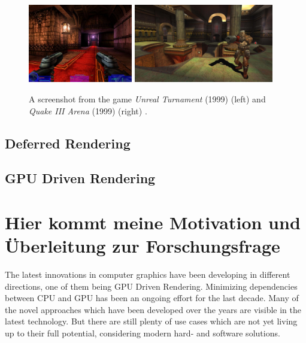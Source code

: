 \begin{figure}[h]
    \centering
    \includegraphics[width=172.5px]{images/graphics/unreal-turnament.jpg}
    \includegraphics[width=230px]{images/graphics/quake-iii-arena.jpg}
    \caption{A screenshot from the game \emph{Unreal Turnament} (1999) (left) and \emph{Quake III Arena} (1999) 
    (right) \cite{GamespotUnrealTurnament, GameWatcher2006}.}
    \label{fig:unreal-turnament-quake-arena}
\end{figure}


\subsection{Deferred Rendering}



\subsection{GPU Driven Rendering}


\section{Hier kommt meine Motivation und Überleitung zur Forschungsfrage}

The latest innovations in computer graphics have been developing in different directions,
one of them being \ac{GPU} Driven Rendering. Minimizing dependencies between \ac{CPU} and \ac{GPU} 
has been an ongoing effort for the last decade. Many of the novel approaches which have been developed 
over the years are visible in the latest technology. But there are still plenty of use cases 
which are not yet living up to their full potential, considering modern hard- and software solutions.\\

